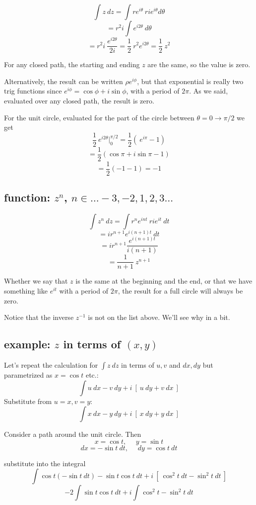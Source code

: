 \documentclass[11pt, oneside]{article}
\begin{document}
\[ \int z \ dz = \int re^{i \theta} \ r i e^{i \theta} d \theta \]
\[ = r^2 i \int e^{i 2\theta}  \ d \theta \]
\[ = r^2 i \ \frac{e^{i 2 \theta}}{2i} = \frac{1}{2} \ r^2 e^{i 2 \theta} = \frac{1}{2} \ z^2 \]

For any closed path, the starting and ending $z$ are the same, so the value is zero.  

Alternatively, the result can be written $\rho e^{i \phi}$, but that exponential is really two trig functions since $e^{i \phi} = \cos \phi + i \sin \phi$, with a period of $2 \pi$.  As we said, evaluated over any closed path, the result is zero.

For the unit circle, evaluated for the part of the circle between $\theta = 0 \rightarrow \pi/2$ we get
\[ \frac{1}{2} \ e^{i 2 \theta} \big |_0^{\pi/2} = \frac{1}{2} ( \ e^{i \pi} - 1) \]
\[ = \frac{1}{2} (\cos \pi + i \sin \pi - 1) \]
\[ = \frac{1}{2} (-1 - 1) = - 1 \]

\subsection*{function:  $z^n$, $n \in \dots -3, -2, 1, 2, 3 \dots$}
\[ \int z^n \ dz = \int r^n e^{int} \ r i e^{it} \ dt \]
\[ = ir^{n+1} e^{i(n+1)t} \ dt \]
\[ = ir^{n+1} \frac{e^{i(n+1)t}}{i(n+1)} \]
\[ = \frac{1}{n + 1} \ z^{n+1} \]

Whether we say that $z$ is the same at the beginning and the end, or that we have something like $e^{it}$ with a period of $2 \pi$, the result for a full circle will always be zero.

Notice that the inverse $z^{-1}$ is not on the list above.  We'll see why in a bit.

\subsection*{example:  $z$ in terms of $(x,y)$}

Let's repeat the calculation for $\int z \ dz$ in terms of $u,v$ and $dx,dy$ but parametrized as $x = \cos t$ etc.:
\[ \int u \ dx - v \ dy + i \ [ \ u \ dy + v \ dx \ ] \]
Substitute from $u = x, v = y$:
\[ \int x \ dx - y \ dy + i \ [ \ x \ dy + y \ dx \ ] \]

Consider a path around the unit circle.  Then
\[ x = \cos t, \ \ \ \ \ \ y = \sin t \]
\[ dx = -\sin t \ dt, \ \ \ \ \ \ dy = \cos t \ dt \]

substitute into the integral
\[ \int \cos t (- \sin t \ dt) - \sin t \cos t \ dt + i \ [ \ \cos^2 t \ dt - \sin^2 t \ dt \ ] \]
\[ -2 \int \sin t \cos t \ dt + i \int  \cos^2 t - \sin^2 t \ dt \]
\end{document}
